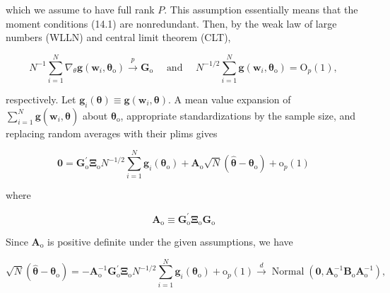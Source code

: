\documentclass[10pt]{article}
\begin{document}
which we assume to have full rank $P$. This assumption essentially means that the moment conditions (14.1) are nonredundant. Then, by the weak law of large numbers (WLLN) and central limit theorem (CLT),


\begin{equation*}
N^{-1} \sum_{i=1}^{N} \nabla_{\theta} \mathbf{g}\left(\mathbf{w}_{i}, \boldsymbol{\theta}_{\mathrm{o}}\right) \xrightarrow{p} \mathbf{G}_{\mathrm{o}} \quad \text { and } \quad N^{-1 / 2} \sum_{i=1}^{N} \mathbf{g}\left(\mathbf{w}_{i}, \boldsymbol{\theta}_{\mathrm{o}}\right)=\mathrm{O}_{p}(1), \tag{14.7}
\end{equation*}


respectively. Let $\mathbf{g}_{i}(\boldsymbol{\theta}) \equiv \mathbf{g}\left(\mathbf{w}_{i}, \boldsymbol{\theta}\right)$. A mean value expansion of $\sum_{i=1}^{N} \mathbf{g}\left(\mathbf{w}_{i}, \hat{\boldsymbol{\theta}}\right)$ about $\boldsymbol{\theta}_{\mathrm{o}}$, appropriate standardizations by the sample size, and replacing random averages with their plims gives


\begin{equation*}
\mathbf{0}=\mathbf{G}_{\mathrm{o}}^{\prime} \boldsymbol{\Xi}_{\mathrm{o}} N^{-1 / 2} \sum_{i=1}^{N} \mathbf{g}_{i}\left(\boldsymbol{\theta}_{\mathrm{o}}\right)+\mathbf{A}_{\mathrm{o}} \sqrt{N}\left(\hat{\boldsymbol{\theta}}-\boldsymbol{\theta}_{\mathrm{o}}\right)+\mathrm{o}_{p}(1) \tag{14.8}
\end{equation*}


where


\begin{equation*}
\mathbf{A}_{\mathrm{o}} \equiv \mathbf{G}_{\mathrm{o}}^{\prime} \boldsymbol{\Xi}_{\mathrm{o}} \mathbf{G}_{\mathrm{o}} \tag{14.9}
\end{equation*}


Since $\mathbf{A}_{\mathrm{o}}$ is positive definite under the given assumptions, we have


\begin{equation*}
\sqrt{N}\left(\hat{\boldsymbol{\theta}}-\boldsymbol{\theta}_{\mathrm{o}}\right)=-\mathbf{A}_{\mathrm{o}}^{-1} \mathbf{G}_{\mathrm{o}}^{\prime} \boldsymbol{\Xi}_{\mathrm{o}} N^{-1 / 2} \sum_{i=1}^{N} \mathbf{g}_{i}\left(\boldsymbol{\theta}_{\mathrm{o}}\right)+\mathrm{o}_{p}(1) \xrightarrow{d} \operatorname{Normal}\left(\mathbf{0}, \mathbf{A}_{\mathrm{o}}^{-1} \mathbf{B}_{\mathrm{o}} \mathbf{A}_{\mathrm{o}}^{-1}\right), \tag{14.10}
\end{equation*}
\end{document}
